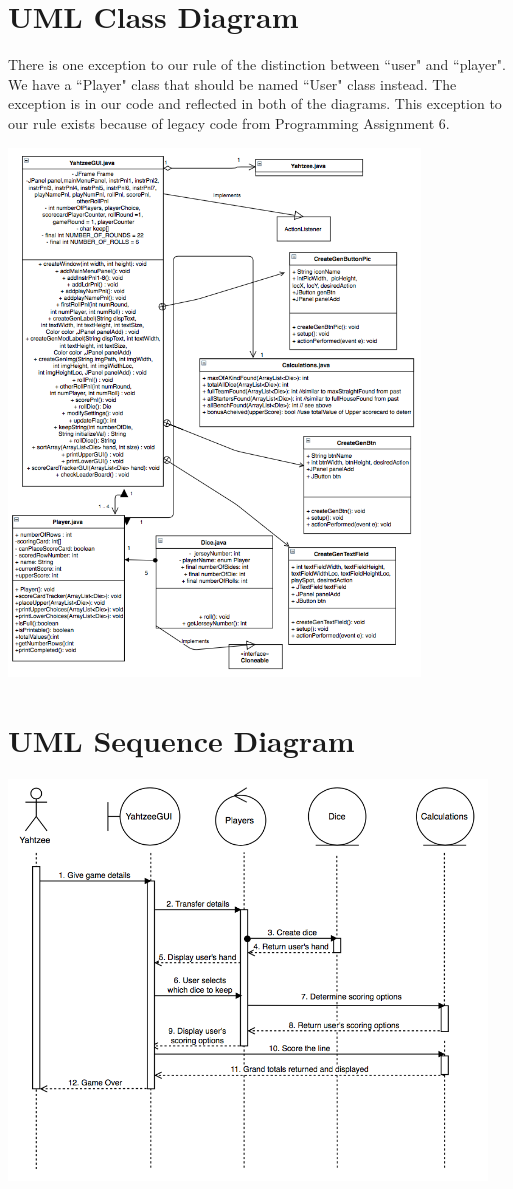 \documentclass[]{report}   %
\begin{document}
\section{UML Class Diagram}     %
There is one exception to our rule of the distinction between ``user" and ``player". We have a ``Player" class that should be named ``User" class instead. The exception is in our code and reflected in both of the diagrams. This exception to our rule exists because of legacy code from Programming Assignment 6.
\begin{center}
\includegraphics[width=4.3in]{Graphics/UMLClassDiagramScreenshot.png}
\end{center}
\section{UML Sequence Diagram}     %
\begin{center}
\includegraphics[width=5in]{Graphics/UMLSequenceDiagramScreenshot.png}
\end{center}
\end{document}
